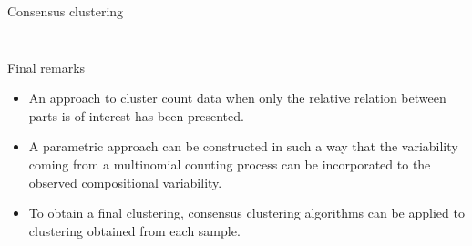 \documentclass[9pt]{beamer}
\begin{document}
\begin{frame}[t]{Consensus clustering}
\begin{columns}
\begin{column}{0.5\textwidth}
\begin{figure}
\end{figure}
\end{column}
\end{columns}

\end{frame}


\begin{frame}{Final remarks}

\begin{itemize}
\item An approach to cluster count data when only the relative relation between parts is of interest has been presented.\vspace{0.2cm}
\item A parametric approach can be constructed in such a way that the variability coming from a multinomial counting process can be incorporated to the observed compositional variability.\vspace{0.2cm}
\item To obtain a final clustering, consensus clustering algorithms can be applied to clustering obtained  from each sample.
\end{itemize}
\end{frame}
\end{document}
